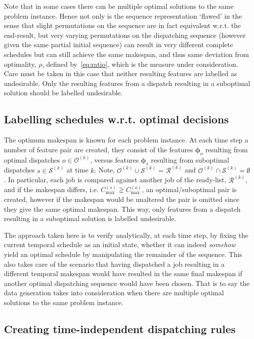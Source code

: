 \documentclass[smallextended]{svjour3}
\renewcommand{\vphi}{\bm \phi}
\begin{document}
Note that in some cases there can be multiple optimal solutions to the same problem instance. Hence not only is the sequence representation `flawed' in the sense that slight permutations on the sequence are in fact equivalent w.r.t. the end-result, but very varying permutations on the dispatching sequence (however given the same partial initial sequence) can result in very different complete schedules but can still achieve the same makespan, and thus same deviation from optimality, $\rho$, defined by~\eqref{eq:ratio}, which is the measure under consideration. Care must be taken in this case that neither resulting features are labelled as undesirable. Only the resulting features from a dispatch resulting in a suboptimal solution should be labelled undesirable. 

\subsection{Labelling schedules w.r.t. optimal decisions}
The optimum makespan is known for each problem instance. 
At each time step a number of feature pair are created, they consist of the features $\vphi_o$ resulting from optimal dispatches $o\in\mathcal{O}^{(k)}$, versus features $\vphi_s$ resulting from suboptimal dispatches $s\in\mathcal{S}^{(k)}$ at time $k$. Note, $\mathcal{O}^{(k)}\cup\mathcal{S}^{(k)}=\mathcal{R}^{(k)}$ and $\mathcal{O}^{(k)}\cap\mathcal{S}^{(k)}=\emptyset$.
In particular, each job is compared against another job of the ready-list, $\mathcal{R}^{(k)}$, and if the makespan differs, i.e. $C_{\max}^{(s)}\gneq C_{\max}^{(o)}$, an optimal/suboptimal pair is created, however if the makespan would be unaltered the pair is omitted since they give the same optimal makespan. This way, only features from a dispatch resulting in a suboptimal solution is labelled undesirable.

The approach taken here is to verify analytically, at each time step, by fixing the current temporal schedule as an initial state, whether it can indeed \emph{somehow} yield an optimal schedule by manipulating the remainder of the sequence. This also takes care of the scenario that having dispatched a job resulting in a different temporal makespan would have resulted in the same final makespan if another optimal dispatching sequence would have been chosen. That is to say the data generation takes into consideration when there are multiple optimal solutions to the same problem instance. 



\subsection{Creating time-independent dispatching rules}\label{sec:ord:timeindependent}
\end{document}
